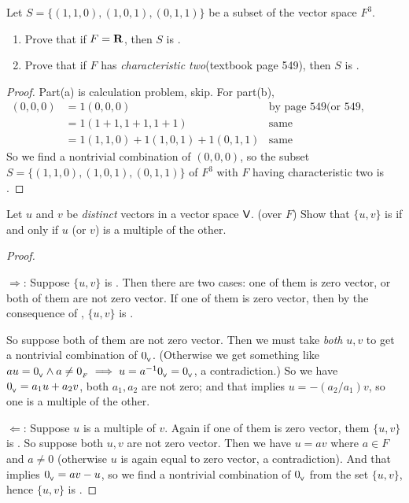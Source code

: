 \begin{exercise} \label{exercise 1.5.8}
Let \(S = \{(1, 1, 0), (1, 0, 1), (0, 1, 1)\}\) be a subset of the vector space \(F^3\).
\begin{enumerate}
\item Prove that if \(F = \mathbf{R}\), then \(S\) is \LID{}.
\item Prove that if \(F\) has \emph{characteristic two}(textbook page 549), then \(S\) is \LDP{}.
\end{enumerate}
\end{exercise}

\begin{proof}
Part(a) is calculation problem, skip.
For part(b),
\begin{align*}
    (0, 0, 0) & = 1(0, 0, 0) & \text{by page 549(or 549, example 4)} \\
              & = 1(1 + 1, 1 + 1, 1 + 1) & \text{same} \\
              & = 1(1, 1, 0) + 1(1, 0, 1) + 1(0, 1, 1) & \text{same}
\end{align*}
So we find a nontrivial combination of \((0, 0, 0)\), so the subset \(S = \{(1, 1, 0), (1, 0, 1), (0, 1, 1)\}\) of \(F^3\) with \(F\) having characteristic two is \LDP{}.
\end{proof}

\begin{exercise} \label{exercise 1.5.9}
Let \(u\) and \(v\) be \emph{distinct} vectors in a vector space \(\textsf{V}\). (over \(F\))
Show that \(\{ u, v \}\) is \LDP{} if and only if \(u\) (or \(v\)) is a multiple of the other.
\end{exercise}

\begin{proof}\ 

\(\Longrightarrow\):
Suppose \(\{ u, v \}\) is \LDP{}.
Then there are two cases: one of them is zero vector, or both of them are not zero vector.
If one of them is zero vector, then by the consequence of , \(\{ u, v \}\) is \LDP{}.

So suppose both of them are not zero vector.
Then we must take \emph{both} \(u, v\) to get a nontrivial combination of \(0_{_{\textsf{V}}}\). (Otherwise we get something like \(a u = 0_{_{\textsf{V}}} \land a \ne 0_{_F} \implies u = a^{-1} 0_{_{\textsf{V}}} = 0_{_{\textsf{V}}}\), a contradiction.)
So we have \(0_{_{\textsf{V}}} = a_1 u + a_2 v\), both \(a_1, a_2\) are not zero;
and that implies \(u = -(a_2/a_1)v\), so one is a multiple of the other.

\(\Longleftarrow\):
Suppose \(u\) is a multiple of \(v\).
Again if one of them is zero vector, them \(\{ u, v \}\) is \LDP{}.
So suppose both \(u, v\) are not zero vector.
Then we have \(u = a v\) where \(a \in F\) and \(a \ne 0\) (otherwise \(u\) is again equal to zero vector, a contradiction).
And that implies \(0_{_{\textsf{V}}} = a v - u\), so we find a nontrivial combination of \(0_{_{\textsf{V}}}\) from the set \(\{u, v\}\), hence \(\{ u, v \}\) is \LDP{}.
\end{proof}

